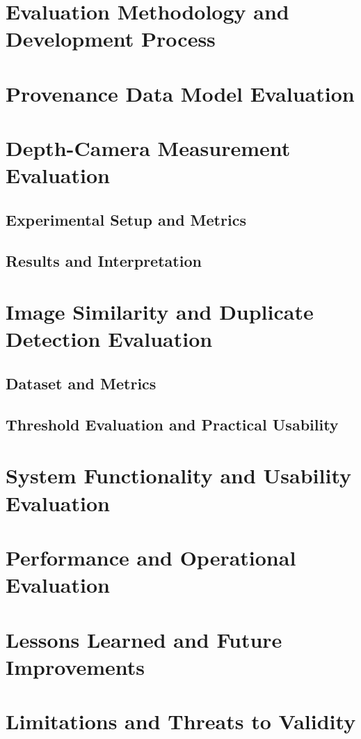 \section{Evaluation Methodology and Development Process}\label{sec:evaluation:methodology}

\section{Provenance Data Model Evaluation}\label{sec:evaluation:data-model}

\section{Depth-Camera Measurement Evaluation}\label{sec:evaluation:camera}

\subsection{Experimental Setup and Metrics}\label{sec:evaluation:camera:setup}

\subsection{Results and Interpretation}\label{sec:evaluation:camera:results}

\section{Image Similarity and Duplicate Detection Evaluation}\label{sec:evaluation:similarity}

\subsection{Dataset and Metrics}\label{sec:evaluation:similarity:dataset}

\subsection{Threshold Evaluation and Practical Usability}\label{sec:evaluation:similarity:threshold}

\section{System Functionality and Usability Evaluation}\label{sec:evaluation:usability}

\section{Performance and Operational Evaluation}\label{sec:evaluation:performance}

\section{Lessons Learned and Future Improvements}\label{sec:evaluation:lessons}

\section{Limitations and Threats to Validity}\label{sec:evaluation:limitations}
